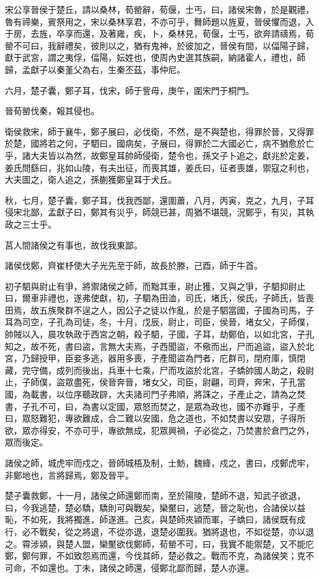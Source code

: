 \begin{pinyinscope}
宋公享晉侯于楚丘，請以桑林，荀罃辭，荀偃，士丐，曰，諸侯宋魯，於是觀禮，魯有禘樂，賓祭用之，宋以桑林享君，不亦可乎，舞師題以旌夏，晉侯懼而退，入于房，去旌，卒享而還，及著雍，疾，卜，桑林見，荀偃，士丐，欲奔請禱焉，荀罃不可曰，我辭禮矣，彼則以之，猶有鬼神，於彼加之，晉侯有間，以偪陽子歸，獻于武宮，謂之夷俘，偪陽，妘姓也，使周內史選其族嗣，納諸霍人，禮也，師歸，孟獻子以秦堇父為右，生秦丕茲，事仲尼。

六月，楚子囊，鄭子耳，伐宋，師于訾毋，庚午，圍宋門于桐門。

晉荀罃伐秦，報其侵也。

衛侯救宋，師于襄牛，鄭子展曰，必伐衛，不然，是不與楚也，得罪於晉，又得罪於楚，國將若之何，子駟曰，國病矣，子展曰，得罪於二大國必亡，病不猶愈於亡乎，諸大夫皆以為然，故鄭皇耳帥師侵衛，楚令也，孫文子卜追之，獻兆於定姜，姜氏問繇曰，兆如山陵，有夫出征，而喪其雄，姜氏曰，征者喪雄，禦寇之利也，大夫圖之，衛人追之，孫蒯獲鄭皇耳于犬丘。

秋，七月，楚子囊，鄭子耳，伐我西鄙，還圍蕭，八月，丙寅，克之，九月，子耳侵宋北鄙，孟獻子曰，鄭其有災乎，師競已甚，周猶不堪競，況鄭乎，有災，其執政之三士乎。

莒人間諸侯之有事也，故伐我東鄙。

諸侯伐鄭，齊崔杼使大子光先至于師，故長於滕，己酉，師于牛首。

初子駟與尉止有爭，將禦諸侯之師，而黜其車，尉止獲，又與之爭，子駟抑尉止曰，爾車非禮也，遂弗使獻，初，子駟為田洫，司氏，堵氏，侯氏，子師氏，皆喪田焉，故五族聚群不逞之人，因公子之徒以作亂，於是子駟當國，子國為司馬，子耳為司空，子孔為司徒，冬，十月，戊辰，尉止，司臣，侯晉，堵女父，子師僕，帥賊以入，晨攻執政于西宮之朝，殺子駟，子國，子耳，劫鄭伯，以如北宮，子孔知之，故不死，書曰盜，言無大夫焉，子西聞盜，不儆而出，尸而追盜，盜入於北宮，乃歸授甲，臣妾多逃，器用多喪，子產聞盜為門者，庀群司，閉府庫，慎閉藏，完守備，成列而後出，兵車十七乘，尸而攻盜於北宮，子蟜帥國人助之，殺尉止，子師僕，盜眾盡死，侯晉奔晉，堵女父，司臣，尉翩，司齊，奔宋，子孔當國，為載書，以位序聽政辟，大夫諸司門子弗順，將誅之，子產止之，請為之焚書，子孔不可，曰，為書以定國，眾怒而焚之，是眾為政也，國不亦難乎，子產曰，眾怒難犯，專欲難成，合二難以安國，危之道也，不如焚書以安眾，子得所欲，眾亦得安，不亦可乎，專欲無成，犯眾興禍，子必從之，乃焚書於倉門之外，眾而後定。

諸侯之師，城虎牢而戍之，晉師城梧及制，士魴，魏絳，戍之，書曰，戍鄭虎牢，非鄭地也，言將歸焉，鄭及晉平。

楚子囊救鄭，十一月，諸侯之師還鄭而南，至於陽陵，楚師不退，知武子欲退，曰，今我逃楚，楚必驕，驕則可與戰矣，欒黶曰，逃楚，晉之恥也，合諸侯以益恥，不如死，我將獨進，師遂進。己亥，與楚師夾潁而軍，子蟜曰，諸侯既有成行，必不戰矣，從之將退，不從亦退，退楚必圍我。猶將退也，不如從楚，亦以退之。霄涉潁，與楚人盟，欒黶欲伐鄭師，荀罃不可，曰，我實不能禦楚，又不能庀鄭，鄭何罪，不如致怨焉而還，今伐其師，楚必救之。戰而不克，為諸侯笑；克不可命，不如還也。丁未，諸侯之師還，侵鄭北鄙而歸，楚人亦還。


\end{pinyinscope}
